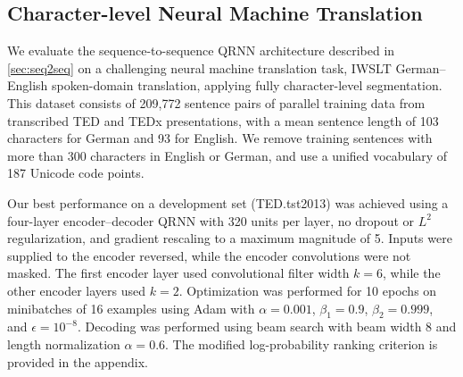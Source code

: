 \documentclass{article} \usepackage{iclr2017_conference,times}
\begin{document}
\subsection{Character-level Neural Machine Translation}

We evaluate the sequence-to-sequence QRNN architecture described in \ref{sec:seq2seq} on a challenging neural machine translation task, IWSLT German--English spoken-domain translation, applying fully character-level segmentation. This dataset consists of 209,772 sentence pairs of parallel training data from transcribed TED and TEDx presentations, with a mean sentence length of 103 characters for German and 93 for English. We remove training sentences with more than 300 characters in English or German, and use a unified vocabulary of 187 Unicode code points.

Our best performance on a development set (TED.tst2013) was achieved using a four-layer encoder--decoder QRNN with 320 units per layer, no dropout or $L^2$ regularization, and gradient rescaling to a maximum magnitude of 5. Inputs were supplied to the encoder reversed, while the encoder convolutions were not masked. The first encoder layer used convolutional filter width $k=6$, while the other encoder layers used $k=2$.
Optimization was performed for 10 epochs on minibatches of 16 examples using Adam \citep{kingma2014adam} with $\alpha=0.001$, $\beta_1=0.9$, $\beta_2=0.999$, and $\epsilon=10^{-8}$. Decoding was performed using beam search with beam width 8 and length normalization $\alpha=0.6$. The modified log-probability ranking criterion is provided in the appendix.
\end{document}
